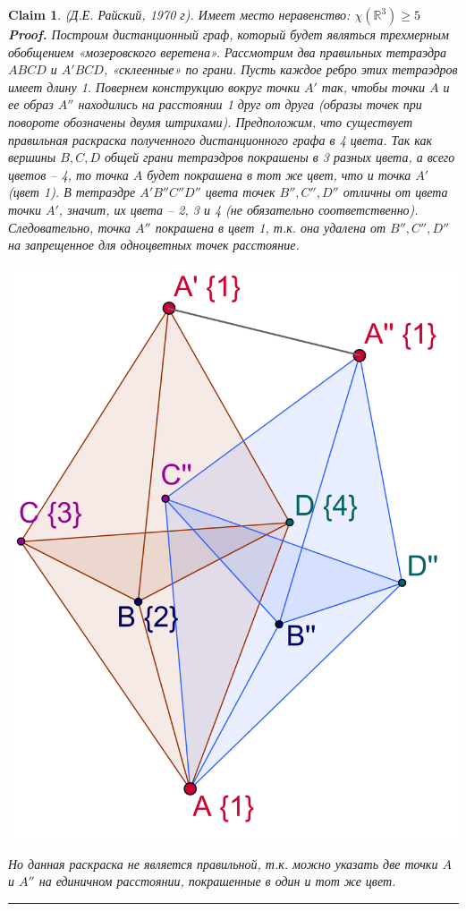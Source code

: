 \documentclass{report}%
\newtheorem{claim}[theorem]{Claim}
\newenvironment{proof}[1][Proof]{\textbf{#1.} }{\ \rule{0.5em}{0.5em}}
\begin{document}
\begin{claim} (Д.Е. Райский, 1970 г).
		Имеет место неравенство: $\chi(\mathbb{R}^3) \geq 5$ \\
		\begin{proof}
				Построим дистанционный граф, который будет являться трехмерным обобщением «мозеровского веретена». 
				Рассмотрим два правильных 	тетраэдра $ABCD$ и $A'BCD$, «склеенные» по грани.
				Пусть каждое ребро этих тетраэдров имеет длину 1. Повернем конструкцию вокруг точки $A'$ так,
				чтобы точки $A$ и ее образ $A''$ находились на расстоянии 1 друг от друга
				(образы точек при повороте обозначены двумя штрихами). Предположим, что существует
				правильная раскраска полученного дистанционного графа в 4 цвета. Так как вершины $B, C, D$
				общей грани тетраэдров покрашены в 3 разных цвета, а всего цветов – 4,
				то точка $A$ будет покрашена в тот же цвет, что и точка $A'$ (цвет {1}).
				В тетраэдре $A'B''C''D''$ цвета точек $B'', C'', D''$ отличны от цвета точки $A'$,
				значит, их цвета –  {2}, {3} и {4} (не обязательно соответственно).
				Следовательно, точка $A''$ покрашена в цвет {1}, т.к. она удалена от $B'',C'',D''$
				на запрещенное для одноцветных точек расстояние. \\
			\begin{center}
					\includegraphics[scale = 0.25]{raisky}
			\end{center}
			
			Но данная раскраска не является правильной, т.к. можно указать две точки $A$ и $A''$
			на единичном расстоянии, покрашенные в один и тот же цвет. 	
		\end{proof}
\end{claim}
\end{document}
